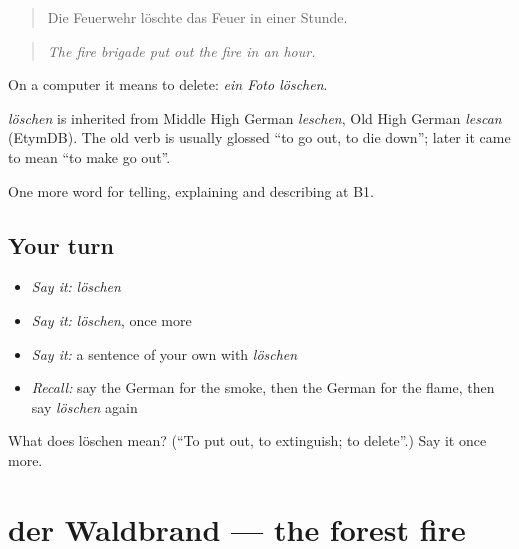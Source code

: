 \begin{quote}
Die Feuerwehr löschte das Feuer in einer Stunde.
\end{quote}

\begin{quote}
\emph{The fire brigade put out the fire in an hour.}
\end{quote}

On a computer it means to delete: \emph{ein Foto löschen}.

\begin{cousinweb}
\emph{löschen} is inherited from Middle High German \emph{leschen}, Old High German \emph{lescan} (EtymDB). The old verb is usually glossed \textquotedblleft{}to go out, to die down\textquotedblright{}; later it came to mean \textquotedblleft{}to make go out\textquotedblright{}.
\end{cousinweb}

\begin{grammarlens}[title={What you've built}]
One more word for telling, explaining and describing at B1.
\end{grammarlens}

\subsection*{Your turn}
\begin{itemize}
\raggedright
  \item \emph{Say it:} \emph{löschen}
  \item \emph{Say it:} \emph{löschen}, once more
  \item \emph{Say it:} a sentence of your own with \emph{löschen}
  \item \emph{Recall:} say the German for the smoke, then the German for the flame, then say \emph{löschen} again
\end{itemize}

\begin{tcolorbox}[breakable,colback=teal!4,colframe=teal!35!black,title={Before you move on}]
What does löschen mean? (\textquotedblleft{}To put out, to extinguish; to delete\textquotedblright{}.) Say it once more.
\end{tcolorbox}
\section[der Waldbrand]{der Waldbrand — the forest fire}

\label{lesson:GE-C293-waldbrand}



